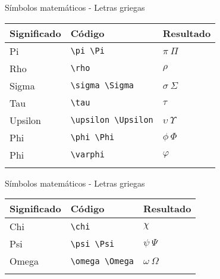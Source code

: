 \documentclass[
  ignorenonframetext,
]{beamer}
\begin{document}
\begin{frame}[fragile]{Símbolos matemáticos - Letras griegas}
\protect\hypertarget{suxedmbolos-matemuxe1ticos---letras-griegas-2}{}
\begin{longtable}[]{@{}lll@{}}
\toprule\noalign{}
Significado & Código & Resultado \\
\midrule\noalign{}
\endhead
Pi & \texttt{\textbackslash{}pi\ \textbackslash{}Pi} & \(\pi\ \Pi\) \\
Rho & \texttt{\textbackslash{}rho} & \(\rho\) \\
Sigma & \texttt{\textbackslash{}sigma\ \textbackslash{}Sigma} &
\(\sigma\ \Sigma\) \\
Tau & \texttt{\textbackslash{}tau} & \(\tau\) \\
Upsilon & \texttt{\textbackslash{}upsilon\ \textbackslash{}Upsilon} &
\(\upsilon\ \Upsilon\) \\
Phi & \texttt{\textbackslash{}phi\ \textbackslash{}Phi} &
\(\phi\ \Phi\) \\
Phi & \texttt{\textbackslash{}varphi} & \(\varphi\) \\
\bottomrule\noalign{}
\end{longtable}
\end{frame}

\begin{frame}[fragile]{Símbolos matemáticos - Letras griegas}
\protect\hypertarget{suxedmbolos-matemuxe1ticos---letras-griegas-3}{}
\begin{longtable}[]{@{}lll@{}}
\toprule\noalign{}
Significado & Código & Resultado \\
\midrule\noalign{}
\endhead
Chi & \texttt{\textbackslash{}chi} & \(\chi\) \\
Psi & \texttt{\textbackslash{}psi\ \textbackslash{}Psi} &
\(\psi\ \Psi\) \\
Omega & \texttt{\textbackslash{}omega\ \textbackslash{}Omega} &
\(\omega\ \Omega\) \\
\bottomrule\noalign{}
\end{longtable}
\end{frame}
\end{document}
